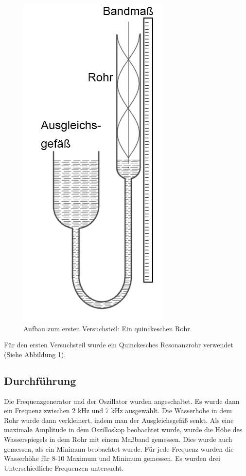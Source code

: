 \documentclass[11pt,a4paper]{article}
\newcommand{\halftime}[4]{\begin{figure}[h]
\begin{minipage}{.#1\textwidth}#3\end{minipage}\begin{minipage}{.#2\textwidth}
\centering
#4\end{minipage}
\end{figure}}
\begin{document}
\begin{figure}
	\centering
	\includegraphics[scale=0.5]{Abb1}
	\caption{Aufbau zum ersten Versuchsteil: Ein quinckeschen Rohr.}
\end{figure}
Für den ersten Versuchsteil wurde ein Quinckesches Resonanzrohr verwendet (Siehe Abbildung 1). 


\subsection{Durchführung}
Die Frequenzgenerator und der Oszillator wurden angeschaltet. Es wurde dann ein Frequenz zwischen 2 kHz und 7 kHz ausgewählt. Die Wasserhöhe in dem Rohr wurde dann verkleinert, indem man der Ausgleichsgefäß senkt. Als eine maximale Amplitude in dem Oszilloskop beobachtet wurde, wurde die Höhe des Wasserspiegels in dem Rohr mit einem Maßband gemessen. Dies wurde auch gemessen, als ein Minimum beobachtet wurde. Für jede Frequenz wurden die Wasserhöhe für 8-10 Maximum und Minimum gemessen. Es wurden drei Unterschiedliche Frequenzen untersucht. 
\end{document}
